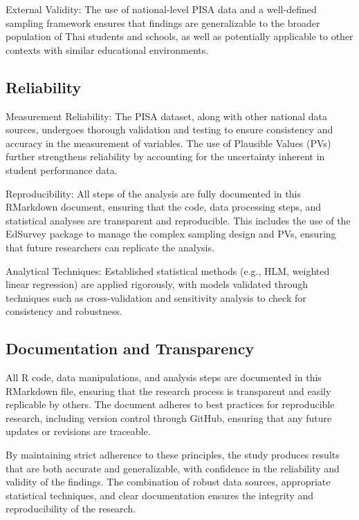 \documentclass[
]{article}
\begin{document}
External Validity: The use of national-level PISA data and a
well-defined sampling framework ensures that findings are generalizable
to the broader population of Thai students and schools, as well as
potentially applicable to other contexts with similar educational
environments.

\hypertarget{reliability}{%
\subsection{Reliability}\label{reliability}}

Measurement Reliability: The PISA dataset, along with other national
data sources, undergoes thorough validation and testing to ensure
consistency and accuracy in the measurement of variables. The use of
Plausible Values (PVs) further strengthens reliability by accounting for
the uncertainty inherent in student performance data.

Reproducibility: All steps of the analysis are fully documented in this
RMarkdown document, ensuring that the code, data processing steps, and
statistical analyses are transparent and reproducible. This includes the
use of the EdSurvey package to manage the complex sampling design and
PVs, ensuring that future researchers can replicate the analysis.

Analytical Techniques: Established statistical methods (e.g., HLM,
weighted linear regression) are applied rigorously, with models
validated through techniques such as cross-validation and sensitivity
analysis to check for consistency and robustness.

\hypertarget{documentation-and-transparency}{%
\subsection{Documentation and
Transparency}\label{documentation-and-transparency}}

All R code, data manipulations, and analysis steps are documented in
this RMarkdown file, ensuring that the research process is transparent
and easily replicable by others. The document adheres to best practices
for reproducible research, including version control through GitHub,
ensuring that any future updates or revisions are traceable.

By maintaining strict adherence to these principles, the study produces
results that are both accurate and generalizable, with confidence in the
reliability and validity of the findings. The combination of robust data
sources, appropriate statistical techniques, and clear documentation
ensures the integrity and reproducibility of the research.
\end{document}
